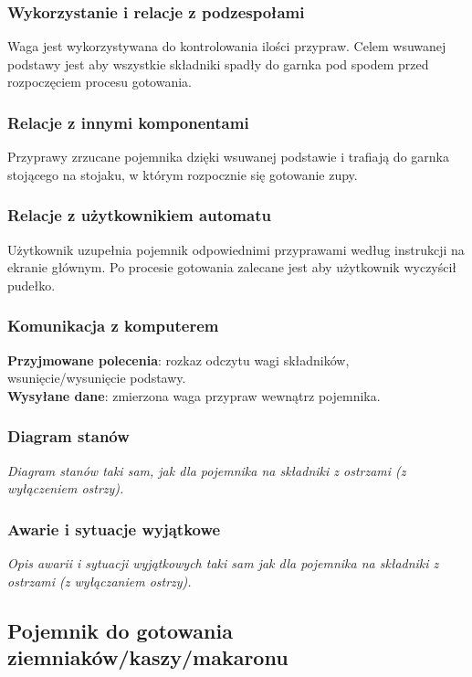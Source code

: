 \documentclass[12pt,a4paper,notitlepage]{article}
\begin{document}
\subsubsection{Wykorzystanie i relacje z podzespołami}
Waga jest wykorzystywana do kontrolowania ilości przypraw. Celem wsuwanej podstawy jest aby wszystkie składniki spadły do garnka pod spodem przed rozpoczęciem procesu gotowania.

\subsubsection{Relacje z innymi komponentami}
Przyprawy zrzucane pojemnika dzięki wsuwanej podstawie i trafiają do garnka stojącego na stojaku, w którym rozpocznie się gotowanie zupy.

\subsubsection{Relacje z użytkownikiem automatu}
Użytkownik uzupełnia pojemnik odpowiednimi przyprawami według instrukcji na ekranie głównym. Po procesie gotowania zalecane jest aby użytkownik wyczyścił pudełko.

\subsubsection{Komunikacja z komputerem}
\textbf{Przyjmowane polecenia}: rozkaz odczytu wagi składników, wsunięcie/wysunięcie podstawy.\\
\textbf{Wysyłane dane}: zmierzona waga przypraw wewnątrz pojemnika.

\subsubsection{Diagram stanów}
\emph{Diagram stanów taki sam, jak dla pojemnika na składniki z ostrzami (z wyłączeniem ostrzy).}

\subsubsection{Awarie i sytuacje wyjątkowe}
\emph{Opis awarii i sytuacji wyjątkowych taki sam jak dla pojemnika na składniki z ostrzami (z wyłączaniem ostrzy).}


\subsection{Pojemnik do gotowania ziemniaków/kaszy/makaronu}
\end{document}
